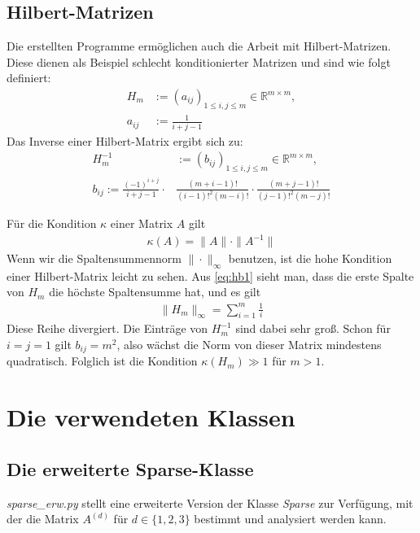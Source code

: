 \documentclass[letterpaper,10pt,ngerman, oneside, openright]{sphinxmanual}
\begin{document}
\section{Hilbert-Matrizen}
Die erstellten Programme ermöglichen auch die Arbeit mit Hilbert-Matrizen. Diese dienen als Beispiel schlecht konditionierter Matrizen und sind wie folgt definiert:
\begin{align}
H_m &:= (a_{ij})_{1\le i, j \le m} \in \mathbb{R}^{m\times m}, 	\\
a_{ij} &:= \frac{1}{i+j-1} \label{eq:hb1}
\end{align}
Das Inverse einer Hilbert-Matrix ergibt sich zu:
\begin{align}
H_m^{-1}& := (b_{ij})_{1\le i, j \le m} \in \mathbb{R}^{m\times m},	\\
b_{ij} := \frac{(-1)^{i+j}}{i+j-1}\cdot &\frac{(m+i-1)!}{(i-1)!^2(m-i)!}\cdot \frac{(m+j-1)!}{(j-1)!^2(m-j)!}
\end{align}

Für die Kondition $\kappa$ einer Matrix $A$ gilt
\begin{align}
\kappa(A)=\|A\|\cdot \|A^{-1}\|
\end{align}
Wenn wir die Spaltensummennorm $\|\cdot \|_{\infty}$ benutzen, ist die hohe Kondition einer Hilbert-Matrix leicht zu sehen. Aus \eqref{eq:hb1}  sieht man, dass die erste Spalte von $H_m$ die höchste Spaltensumme hat, und es gilt
\begin{align}
\|H_m\|_{\infty}=\sum_{i=1}^{m}\frac{1}{i}
\end{align}
Diese Reihe divergiert. Die Einträge von $H_m^{-1}$ sind dabei sehr groß. Schon für $i=j=1$ gilt $b_{ij} = m^2$, also wächst die Norm von dieser Matrix mindestens quadratisch. Folglich ist die Kondition $\kappa(H_m)\gg1$ für $m>1$.

\chapter{Die verwendeten Klassen}
\section{Die erweiterte Sparse-Klasse}

\label{\detokenize{index:welcome-to-serie-3-s-documentation}}\label{\detokenize{index:module-sparse_erw}}\label{\detokenize{index:die-sparse-klasse}}
\textit{sparse\_erw.py} stellt eine erweiterte Version der  Klasse \textit{Sparse} zur Verfügung, mit der die Matrix $A^{(d)}$ für $d\in\{1,2,3\}$
bestimmt und analysiert werden kann.
\end{document}
